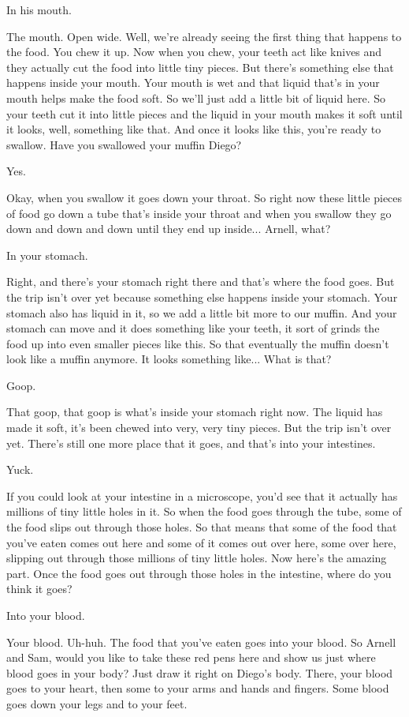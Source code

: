 In his mouth.

The mouth. Open wide. Well, we're already seeing the first thing that happens to the food. You chew it up. Now when you chew, your teeth act like knives and they actually cut the food into little tiny pieces. But there's something else that happens inside your mouth. Your mouth is wet and that liquid that's in your mouth helps make the food soft. So we'll just add a little bit of liquid here. So your teeth cut it into little pieces and the liquid in your mouth makes it soft until it looks, well, something like that. And once it looks like this, you're ready to swallow. Have you swallowed your muffin Diego?

Yes.

Okay, when you swallow it goes down your throat. So right now these little pieces of food go down a tube that's inside your throat and when you swallow they go down and down and down until they end up inside... Arnell, what?

In your stomach.

Right, and there's your stomach right there and that's where the food goes. But the trip isn't over yet because something else happens inside your stomach. Your stomach also has liquid in it, so we add a little bit more to our muffin. And your stomach can move and it does something like your teeth, it sort of grinds the food up into even smaller pieces like this. So that eventually the muffin doesn't look like a muffin anymore. It looks something like... What is that?

Goop.

That goop, that goop is what's inside your stomach right now. The liquid has made it soft, it's been chewed into very, very tiny pieces. But the trip isn't over yet. There's still one more place that it goes, and that's into your intestines.

Yuck.

If you could look at your intestine in a microscope, you'd see that it actually has millions of tiny little holes in it. So when the food goes through the tube, some of the food slips out through those holes. So that means that some of the food that you've eaten comes out here and some of it comes out over here, some over here, slipping out through those millions of tiny little holes. Now here's the amazing part. Once the food goes out through those holes in the intestine, where do you think it goes?

Into your blood.

Your blood. Uh-huh. The food that you've eaten goes into your blood. So Arnell and Sam, would you like to take these red pens here and show us just where blood goes in your body? Just draw it right on Diego's body. There, your blood goes to your heart, then some to your arms and hands and fingers. Some blood goes down your legs and to your feet.

